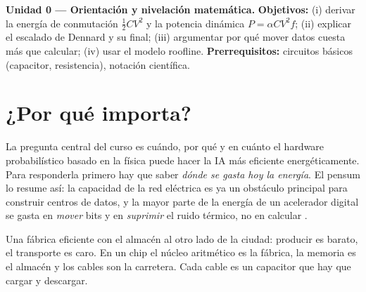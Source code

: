 \documentclass[11pt,a4paper]{article}
\begin{document}

\noindent\textbf{Unidad 0 --- Orientación y nivelación matemática.}\quad
\textbf{Objetivos:} (i) derivar la energía de conmutación $\tfrac12CV^2$ y la potencia dinámica
$P=\alpha CV^2f$; (ii) explicar el escalado de Dennard y su final; (iii) argumentar por qué mover datos
cuesta más que calcular; (iv) usar el modelo roofline.
\textbf{Prerrequisitos:} circuitos básicos (capacitor, resistencia), notación científica.

\section{¿Por qué importa?}
La pregunta central del curso es cuándo, por qué y en cuánto el hardware probabilístico basado en la
física puede hacer la IA más eficiente energéticamente. Para responderla primero hay que saber
\emph{dónde se gasta hoy la energía}. El pensum lo resume así: la capacidad de la red eléctrica es ya
un obstáculo principal para construir centros de datos, y la mayor parte de la energía de un acelerador
digital se gasta en \emph{mover} bits y en \emph{suprimir} el ruido térmico, no en calcular \cite{conte}.

\begin{intuicion}
Una fábrica eficiente con el almacén al otro lado de la ciudad: producir es barato, el transporte es
caro. En un chip el núcleo aritmético es la fábrica, la memoria es el almacén y los cables son la
carretera. Cada cable es un capacitor que hay que cargar y descargar.
\end{intuicion}
\end{document}
